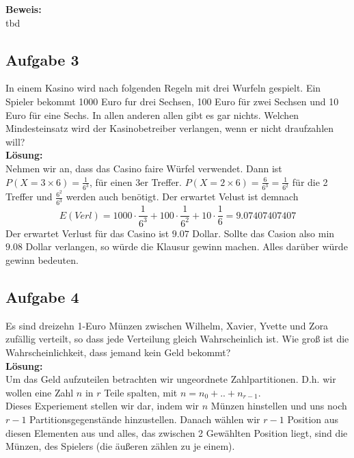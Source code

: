 \documentclass[11pt,a4paper,ngerman]{article}
\begin{document}
\textbf{Beweis:}\\

tbd

\subsection*{Aufgabe 3}

In einem Kasino wird nach folgenden Regeln mit drei Wurfeln gespielt. Ein Spieler
bekommt 1000 Euro fur drei Sechsen, 100 Euro für zwei Sechsen und 10 Euro für
eine Sechs. In allen anderen allen gibt es gar nichts. Welchen Mindesteinsatz wird
der Kasinobetreiber verlangen, wenn er nicht draufzahlen will?\\

\textbf{Lösung:}\\

Nehmen wir an, dass das Casino faire Würfel verwendet. Dann ist
$P( X = 3\times6) = \frac{1}{6^3}$, für einen 3er Treffer. $P( X = 2 \times 6) = \frac{6}{6^3} = \frac{1}{6^2}$ für
die 2 Treffer und $\frac{6^2}{6^3}$ werden auch benötigt. Der erwartet Velust ist demnach
\[
    E(Verl) = 1000 \cdot \frac{1}{6^3} + 100 \cdot \frac{1}{6^2} + 10 \cdot \frac{1}{6} = 9.07407407407
\]
Der erwartet Verlust für das Casino ist $9.07$ Dollar. Sollte das Casion also min $9.08$ Dollar verlangen, so
würde die Klausur gewinn machen. Alles darüber würde gewinn bedeuten.

\subsection*{Aufgabe 4}

Es sind dreizehn 1-Euro Münzen zwischen Wilhelm, Xavier, Yvette und Zora zufällig verteilt, so dass jede Verteilung gleich Wahrscheinlich ist.
Wie groß ist die Wahrscheinlichkeit, dass jemand kein Geld bekommt?\\

\textbf{Lösung:}\\

Um das Geld aufzuteilen betrachten wir ungeordnete Zahlpartitionen. D.h. wir wollen eine Zahl $n$ in $r$ Teile spalten, mit $n = n_0 + .. + n_{r-1}$.\\

Dieses Experiement stellen wir dar, indem wir $n$ Münzen hinstellen und uns noch $r-1$ Partitionsgegenstände hinzustellen. Danach wählen wir $r-1$ Position
aus diesen Elementen aus und alles, das zwischen 2 Gewählten Position liegt, sind die Münzen, des Spielers (die äußeren zählen zu je einem).
\end{document}
